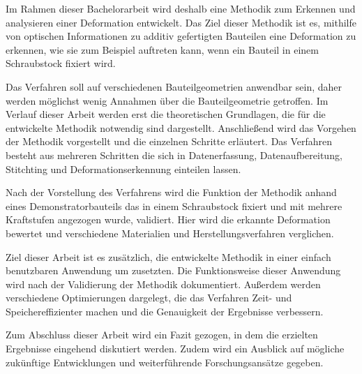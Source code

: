 Im Rahmen dieser Bachelorarbeit wird deshalb eine Methodik zum Erkennen und 
analysieren einer Deformation entwickelt. Das Ziel dieser Methodik ist es, 
mithilfe von optischen Informationen zu additiv gefertigten Bauteilen eine 
Deformation zu erkennen, wie sie zum Beispiel auftreten kann, wenn ein Bauteil 
in einem Schraubstock fixiert wird.

Das Verfahren soll auf verschiedenen Bauteilgeometrien anwendbar sein, daher werden 
möglichst wenig Annahmen über die Bauteilgeometrie getroffen.
Im Verlauf dieser Arbeit werden erst die theoretischen Grundlagen, die für die 
entwickelte Methodik notwendig sind dargestellt. 
Anschließend wird das Vorgehen der Methodik vorgestellt und die einzelnen 
Schritte erläutert. Das Verfahren besteht aus mehreren Schritten die sich in 
Datenerfassung, Datenaufbereitung, Stitchting und Deformationserkennung 
einteilen lassen.

Nach der Vorstellung des Verfahrens wird die Funktion der Methodik anhand eines 
Demonstratorbauteils das in einem Schraubstock fixiert und mit mehrere Kraftstufen 
angezogen wurde, validiert. Hier wird die erkannte Deformation bewertet und 
verschiedene Materialien und Herstellungsverfahren verglichen.

Ziel dieser Arbeit ist es zusätzlich, die entwickelte Methodik in einer einfach
benutzbaren Anwendung um zusetzten. Die Funktionsweise dieser Anwendung wird 
nach der Validierung der Methodik dokumentiert. Außerdem werden verschiedene 
Optimierungen dargelegt, die das Verfahren Zeit- und Speichereffizienter machen
und die Genauigkeit der Ergebnisse verbessern.

Zum Abschluss dieser Arbeit wird ein Fazit gezogen, in dem die erzielten 
Ergebnisse eingehend diskutiert werden. Zudem wird ein Ausblick auf 
mögliche zukünftige Entwicklungen und weiterführende Forschungsansätze gegeben.



